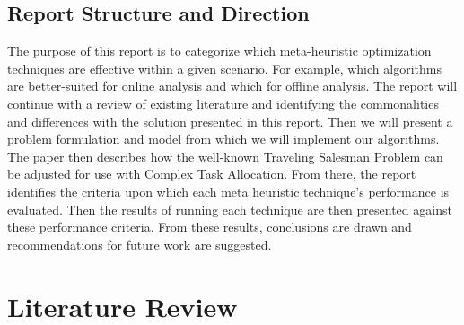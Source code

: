 \documentclass[a4paper]{article}
\begin{document}
\subsection{Report Structure and Direction}
The purpose of this report is to categorize which meta-heuristic optimization techniques are effective within a given scenario. For example, which algorithms are better-suited for online analysis and which for offline analysis.
The report will continue with a review of existing literature and identifying the commonalities and differences with the solution presented in this report. Then we will present a problem formulation and model from which we will implement our algorithms. The paper then describes how the well-known Traveling Salesman Problem can be adjusted for use with Complex Task Allocation. From there, the report identifies the criteria upon which each meta heuristic technique's performance is evaluated. Then the results of running each technique are then presented against these performance criteria. From these results, conclusions are drawn and recommendations for future work are suggested.






\section{Literature Review}
\end{document}
